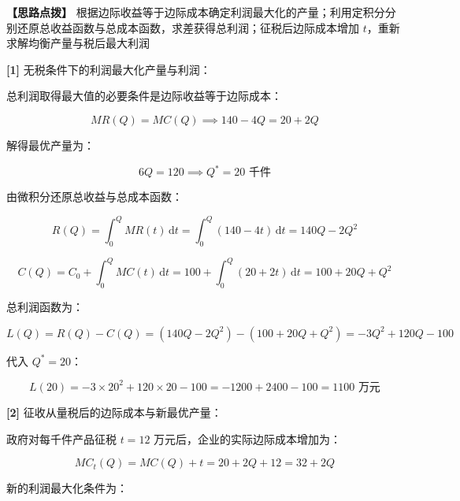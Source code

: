 \documentclass[11pt,a4paper,UTF8]{ctexart}
\begin{document}
\textbf{\color{DeepPurple}【思路点拨】} 根据边际收益等于边际成本确定利润最大化的产量；利用定积分分别还原总收益函数与总成本函数，求差获得总利润；征税后边际成本增加 $t$，重新求解均衡产量与税后最大利润


\begin{solbox}[分步推导与答题规范]
\textbf{[1]} 无税条件下的利润最大化产量与利润：

总利润取得最大值的必要条件是边际收益等于边际成本：


\begin{equation*}
MR(Q) = MC(Q) \implies 140 - 4Q = 20 + 2Q
\end{equation*}


解得最优产量为：


\begin{equation*}
6Q = 120 \implies Q^* = 20\text{ 千件}
\end{equation*}


由微积分还原总收益与总成本函数：


\begin{equation*}
R(Q) = \int_0^Q MR(t)\,\mathrm{d}t = \int_0^Q (140 - 4t)\,\mathrm{d}t = 140Q - 2Q^2
\end{equation*}



\begin{equation*}
C(Q) = C_0 + \int_0^Q MC(t)\,\mathrm{d}t = 100 + \int_0^Q (20 + 2t)\,\mathrm{d}t = 100 + 20Q + Q^2
\end{equation*}


总利润函数为：


\begin{equation*}
L(Q) = R(Q) - C(Q) = (140Q - 2Q^2) - (100 + 20Q + Q^2) = -3Q^2 + 120Q - 100
\end{equation*}


代入 $Q^* = 20$：


\begin{equation*}
L(20) = -3 \times 20^2 + 120 \times 20 - 100 = -1200 + 2400 - 100 = 1100\text{ 万元}
\end{equation*}


\textbf{[2]} 征收从量税后的边际成本与新最优产量：

政府对每千件产品征税 $t = 12$ 万元后，企业的实际边际成本增加为：


\begin{equation*}
MC_t(Q) = MC(Q) + t = 20 + 2Q + 12 = 32 + 2Q
\end{equation*}


新的利润最大化条件为：



\end{solbox}
\end{document}
